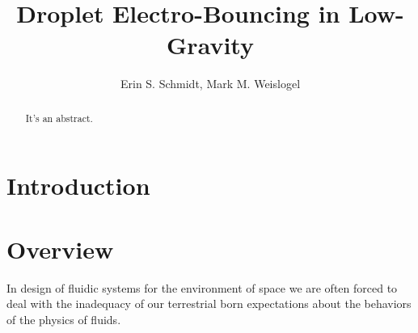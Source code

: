 \documentclass[a4paper, 12pt]{article}
\title{\textsf{\textbf{Droplet Electro-Bouncing in Low-Gravity}}}
\author{Erin S. Schmidt, Mark M. Weislogel}
\date{}
\begin{document}
\maketitle

\begin{abstract}
\noindent
It's an abstract.
\end{abstract}
\doublespacing
\section{Introduction}


\section{Overview}
In design of fluidic systems for the environment of space we are often forced to deal with the inadequacy of our terrestrial born expectations about the behaviors of the physics of fluids.   
\end{document}
